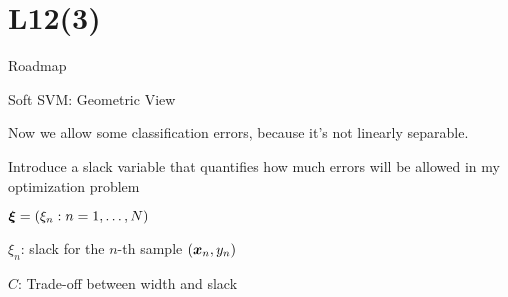 \documentclass[handout,fleqn,aspectratio=169]{beamer}
\begin{document}
\section{L12(3)}
\begin{frame}{Roadmap}

\plitemsep 0.1in

\bce[(1)] 

\item {}
\item {} 
\item {} 
\item {} 

\ece
\end{frame}


\begin{frame}{Soft SVM: Geometric View}

\plitemsep 0.07in
\bci

\item Now we allow some classification errors, because it's not linearly separable. 

\item Introduce a slack variable that quantifies how much errors will be allowed in my optimization problem
{
\small
\item $\bm{\xi} = (\xi_n: n=1, \ldots, N)$
\item $\xi_n$: slack for the $n$-th sample $(\bm{x}_n,y_n)$
\begin{tcolorbox}[colback=red!5!white,colframe=red!75!black]
\vspace{-0.3cm}
\end{tcolorbox}

\item $C$: Trade-off between width and slack
}
{
}

\eci
\end{frame}
\end{document}
